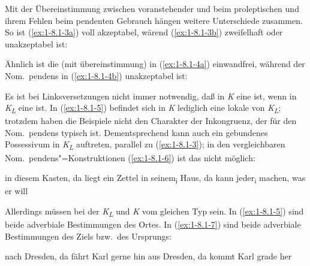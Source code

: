 \documentclass[output=paper]{langsci/langscibook}
\begin{document}
Mit der Übereinstimmung zwischen voranstehender  und
 beim proleptischen und ihrem Fehlen beim pendenten Gebrauch
hängen weitere Unterschiede zusammen. So ist (\ref{ex:1-8.1-3a}) voll
akzeptabel, wärend (\ref{ex:1-8.1-3b}) zweifelhaft oder unakzeptabel
ist:
\begin{exe}
\ex\label{ex:1-8.1-3}
\begin{xlist}
\end{xlist}
\end{exe}
Ähnlich ist die  (mit übereinstimmung) in (\ref{ex:1-8.1-4a}) einwandfrei,
während der Nom.\ pendens in (\ref{ex:1-8.1-4b}) unakzeptabel ist:
\begin{exe}
\ex\label{ex:1-8.1-4}
\begin{xlist}
\end{xlist}
\end{exe}
Es ist bei Linksversetzungen nicht immer notwendig, daß in \textit{K} eine  ist, wenn in \textit{K\textsubscript{L}} eine ist. In (\ref{ex:1-8.1-5}) befindet sich in \textit{K} lediglich eine lokale 
von \textit{K\textsubscript{L}}; trotzdem haben die Beispiele nicht den Charakter der Inkongruenz, der für
den Nom.\ pendens typisch ist. Dementsprechend kann auch ein gebundenes Possessivum in \textit{K\textsubscript{L}} auftreten, parallel zu (\ref{ex:1-8.1-3}); in den vergleichbaren Nom.\ pendens"=Konstruktionen (\ref{ex:1-8.1-6}) ist das nicht möglich:
\begin{exe}
\ex\label{ex:1-8.1-5}
\begin{xlist}
\ex\label{ex:1-8.1-5a} in diesem Kasten, da liegt ein Zettel
\ex\label{ex:1-8.1-5b} in seinem\textsubscript{i} Haus, da kann jeder\textsubscript{i} machen, was er will
\end{xlist}
\end{exe}
\begin{exe}
\ex\label{ex:1-8.1-6}
\begin{xlist}
\end{xlist}
\end{exe}
Allerdings müssen bei der  \textit{K\textsubscript{L}} und \textit{K} vom gleichen Typ sein. In (\ref{ex:1-8.1-5})
sind beide adverbiale Bestimmungen des Ortes. In (\ref{ex:1-8.1-7}) sind beide adverbiale Bestimmungen des Ziels bzw.\ des Ursprungs:
\begin{exe}
\ex\label{ex:1-8.1-7}
\begin{xlist}
\ex\label{ex:1-8.1-7a} nach Dresden, da fährt Karl gerne hin
\ex\label{ex:1-8.1-7b} aus Dresden, da kommt Karl grade her
\end{xlist}
\end{exe}
 
\end{document}
